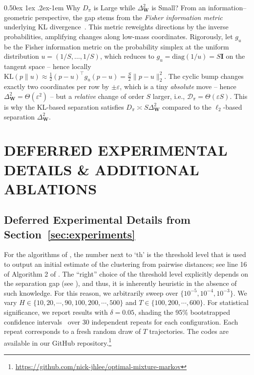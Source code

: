\documentclass[twoside]{article}
\makeatletter
\renewcommand{\paragraph}{%
  \@startsection{paragraph}{4}%
  {\z@}{0.50ex \@plus 1ex \@minus .2ex}{-1em}%
  {\normalfont\normalsize\bfseries}%
}
\def\mI{{\bm{I}}}
\def\mW{{\bm{W}}}
\def\gD{{\mathcal{D}}}
\theoremstyle{plain}
\makeatother
\begin{document}
\paragraph{Why $D_\pi$ is Large while $\Delta_\mW^2$ is Small?}
From an information–geometric perspective, the gap stems from the \emph{Fisher information metric} underlying KL divergence~\citep{infogeom,nielsen2020infogeom}.
This metric reweights directions by the inverse probabilities, amplifying changes along low-mass coordinates.
Rigorously, let $g_u$ be the Fisher information metric on the probability simplex at the uniform distribution $u=(1/S,\ldots,1/S)$, which reduces to $g_u = \mathrm{diag}(1/u) = S \mI$ on the tangent space -- hence locally $\mathrm{KL}(p\|u)\approx \tfrac12 (p-u)^\top g_u (p-u)=\tfrac{S}{2}\|p-u\|_2^2$.
The cyclic bump changes exactly two coordinates per row by $\pm\varepsilon$, which is a tiny \emph{absolute} move -- hence $\Delta_\mW^2=\Theta(\varepsilon^2)$ -- but a \emph{relative} change of order $S$ larger, i.e., $\gD_\pi = \Theta(\varepsilon S)$.
This is why the KL-based separation satisfies $D_\pi\asymp S \Delta_\mW^2$ compared to the $\ell_2$-based separation $\Delta_\mW^2$.

\newpage
\section{DEFERRED EXPERIMENTAL DETAILS \& ADDITIONAL ABLATIONS}
\label{app:experiments}

\subsection{\texorpdfstring{Deferred Experimental Details from Section~\ref{sec:experiments}}{Deferred Experimental Details from Section 6}}
\label{app:exp-details}
For the algorithms of \citet{kausik2023mixture}, the number next to `th' is the threshold level that is used to output an initial estimate of the clustering from pairwise distances; see line 16 of Algorithm 2 of \citet{kausik2023mixture}.
The ``right'' choice of the threshold level explicitly depends on the separation gap (see \citet[Theorem 1]{kausik2023mixture}), and thus, it is inherently heuristic in the absence of such knowledge.
For this reason, we arbitrarily sweep over $\{10^{-5}, 10^{-4}, 10^{-3}\}$.
We vary $H \in \{10, 20, \cdots, 90, 100, 200, \cdots, 500\}$ and $T \in \{100, 200, \cdots, 600\}$.
For statistical significance, we report results with $\delta = 0.05$, shading the 95\% bootstrapped confidence intervals~\citep{efron1979bootstrapping,diciccio1996bootstrapping} over 30 independent repeats for each configuration.
Each repeat corresponds to a fresh random draw of $T$ trajectories.
The codes are available in our GitHub repository.\footnote{\url{https://github.com/nick-jhlee/optimal-mixture-markov}}
\end{document}
